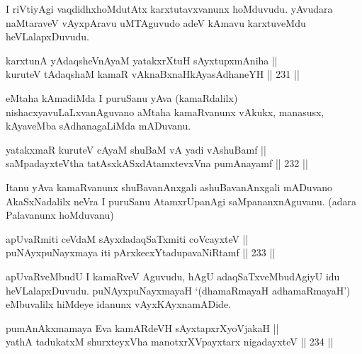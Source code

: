 \begin{artha}
I riVtiyAgi vaqdidhxhoMdutAtx karxtutavxvanunx hoMduvudu. yAvudara
naMtaraveV vAyxpAravu uMTAguvudo adeV kAmavu karxtuveMdu heVLalapxDuvudu.
\end{artha}


\begin{shl}
karxtunA yAdaqsheVnAyaM yatakxrXtuH sAyxtupxmAniha || \\
kuruteV tAdaqshaM kamaR vAknaBxnaHkAyasAdhaneYH \hfill || 231 || 
\end{shl}

\begin{artha}
eMtaha kAmadiMda I puruSanu yAva (kamaRdalilx)\break
nishacxyavuLaLxvanAguvano aMtaha kamaRvanunx vAkukx, manasusx,
kAyaveMba sAdhanagaLiMda mADuvanu.
\end{artha}

\begin{shl}
yatakxmaR kuruteV cAyaM shuBaM vA yadi vA\s shuBamf || \\
saMpadayxteV\s tha tatAsxkASxdAtamxtevxVna pumAnayamf \hfill || 232 ||  
\end{shl}

\begin{artha}
Itanu yAva kamaRvanunx shuBavanAnxgali ashuBavanAnxgali mADuvano
AkaSxNadalilx neVra I puruSanu AtamxrUpanAgi saMpananxnAguvanu.
(adara Palavanunx hoMduvanu) 
\end{artha}


\begin{shl}
apUvaRmiti ceVdaM sAyxdadaqSaTxmiti coVcayxteV || \\
puNAyxpuNayxmaya iti pArxkecxYtadupavaNiRtamf \hfill || 233 ||  
\end{shl}

\begin{artha}
apUvaRveMbudU I kamaRveV Aguvudu, hAgU adaqSaTxveMbudAgiyU idu
heVLalapxDuvudu. puNAyxpuNayxmayaH `(dhamaRmayaH adhamaRmayaH')
eMbuvalilx hiMdeye idanunx vAyxKAyxnamADide.
\end{artha}


\begin{shl}
pumAnAkxmamaya Eva kamARdeVH sAyxtapxrXyoVjakaH || \\
yathA tadukatxM shurxteyxVha manotxrXV\s payxtarx nigadayxteV \hfill || 234 ||  
\end{shl}

